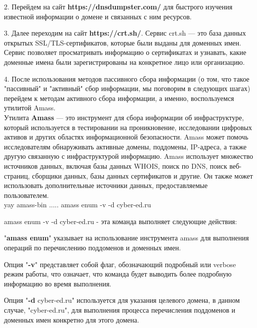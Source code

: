 	\par 2. Перейдем на сайт \textbf{https://dnsdumpster.com/} для быстрого изучения известной информации о домене и связанных с ним ресурсов.
	
	
	\par 3. Далее переходим на сайт \textbf{https://crt.sh/}. Сервис crt.sh — это база данных открытых SSL/TLS-сертификатов, которые были выданы для доменных имен. Сервис позволяет просматривать информацию о сертификатах и узнавать, какие доменные имена были зарегистрированы на конкретное лицо или организацию.
	
	
	\par 4. После использования методов пассивного сбора информации (о том, что такое "пассивный" и "активный" сбор информации, мы поговорим в следующих шагах) перейдем к методам активного сбора информации, ​а именно, ​​​​​​воспользуемся утилитой Amass. 
	\\
	Утилита \textbf{Amass} — это инструмент для сбора информации об инфраструктуре, который используется в тестировании на проникновение, исследовании цифровых активов и других областях информационной безопасности. Amass может помочь исследователям обнаруживать активные домены, поддомены, IP-адреса, а также другую связанную с инфраструктурой информацию. Amass использует множество источников данных, включая базы данных WHOIS, поиск по DNS, поиск веб-страниц, сборщики данных, базы данных сертификатов и другие. Он также может использовать дополнительные источники данных, предоставляемые пользователем.
	\\
	yay amass-bin ..... amass enum -v -d cyber-ed.ru
	
	\par amass enum -v -d cyber-ed.ru - эта команда выполняет следующие действия:
	
	\par "\textbf{amass enum}" указывает на использование инструмента amass для выполнения операций по перечислению поддоменов и доменных имен.
	
	\par Опция "\textbf{-v}" представляет собой флаг, обозначающий подробный или verbose режим работы, что означает, что команда будет выводить более подробную информацию во время выполнения.
	
	\par Опция "\textbf{-d} cyber-ed.ru" используется для указания целевого домена, в данном случае, "cyber-ed.ru", для выполнения процесса перечисления поддоменов и доменных имен конкретно для этого домена.
	
